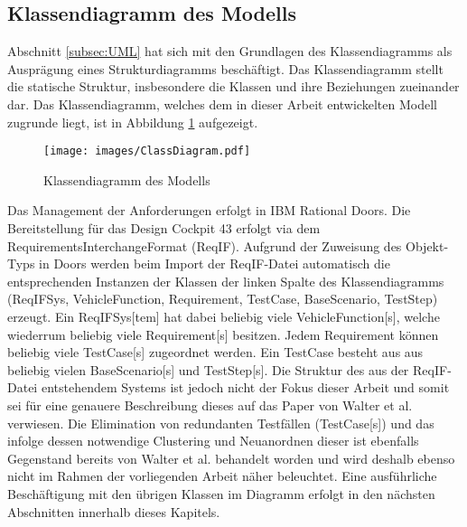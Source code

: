 \subsection{Klassendiagramm des Modells}
\label{subsec:ClassDiagram_Model}
Abschnitt \ref{subsec:UML} hat sich mit den Grundlagen des Klassendiagramms als Ausprägung eines Strukturdiagramms beschäftigt. Das Klassendiagramm stellt die statische Struktur, insbesondere die Klassen und ihre Beziehungen zueinander dar. Das Klassendiagramm, welches dem in dieser Arbeit entwickelten Modell zugrunde liegt, ist in Abbildung \ref{img:ClassDiagram_Model} aufgezeigt.\\
\begin{figure}
	\centering
	\texttt{[image: images/ClassDiagram.pdf]}
	\caption{Klassendiagramm des Modells}
	\label{img:ClassDiagram_Model}
\end{figure}
Das Management der Anforderungen erfolgt in IBM\textsuperscript{\textregistered} Rational\textsuperscript{\textregistered} Doors\textsuperscript{\textregistered}. Die Bereitstellung für das Design Cockpit 43\textsuperscript{\textregistered} erfolgt via dem RequirementsInterchangeFormat (ReqIF). Aufgrund der Zuweisung des Objekt-Typs in Doors\textsuperscript{\textregistered} werden beim Import der ReqIF-Datei automatisch die entsprechenden Instanzen der Klassen der linken Spalte des Klassendiagramms (ReqIFSys, VehicleFunction, Requirement, TestCase, BaseScenario, TestStep) erzeugt. Ein ReqIFSys[tem] hat dabei beliebig viele VehicleFunction[s], welche wiederrum beliebig viele Requirement[s] besitzen. Jedem Requirement können beliebig viele TestCase[s] zugeordnet werden. Ein TestCase besteht aus aus beliebig vielen BaseScenario[s] und TestStep[s]. Die Struktur des aus der ReqIF-Datei entstehendem Systems ist jedoch nicht der Fokus dieser Arbeit und somit sei für eine genauere Beschreibung dieses  auf das Paper von Walter et al. \cite{WHPR17} verwiesen. Die Elimination von redundanten Testfällen (TestCase[s]) und das infolge dessen notwendige Clustering und Neuanordnen dieser ist ebenfalls Gegenstand bereits von Walter et al. behandelt worden \cite{WSPR17} und wird deshalb ebenso nicht im Rahmen der vorliegenden Arbeit näher beleuchtet. Eine ausführliche Beschäftigung mit den übrigen Klassen im Diagramm erfolgt in den nächsten Abschnitten innerhalb dieses Kapitels.
